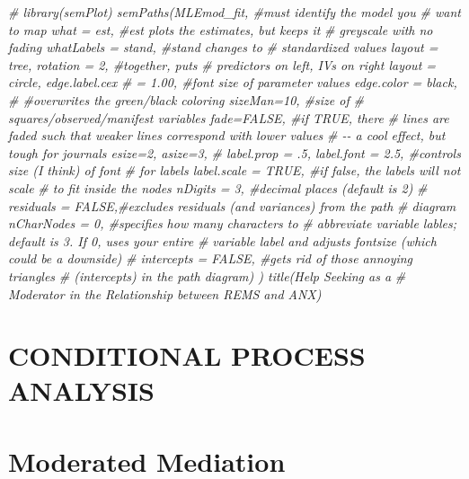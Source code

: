 \documentclass[
  11pt,
]{book}
\newenvironment{Shaded}{\begin{snugshade}}{\end{snugshade}}
\newcommand{\CommentTok}[1]{\textcolor[rgb]{0.37,0.37,0.37}{\textit{#1}}}
\begin{document}
\begin{Shaded}
\begin{Highlighting}[]
\CommentTok{\# library(semPlot) semPaths(MLEmod\_fit, \#must identify the model you}
\CommentTok{\# want to map what = \textquotesingle{}est\textquotesingle{}, \#\textquotesingle{}est\textquotesingle{} plots the estimates, but keeps it}
\CommentTok{\# greyscale with no fading whatLabels = \textquotesingle{}stand\textquotesingle{}, \#\textquotesingle{}stand\textquotesingle{} changes to}
\CommentTok{\# standardized values layout = \textquotesingle{}tree\textquotesingle{}, rotation = 2, \#together, puts}
\CommentTok{\# predictors on left, IVs on right layout = \textquotesingle{}circle\textquotesingle{}, edge.label.cex}
\CommentTok{\# = 1.00, \#font size of parameter values edge.color = \textquotesingle{}black\textquotesingle{},}
\CommentTok{\# \#overwrites the green/black coloring sizeMan=10, \#size of}
\CommentTok{\# squares/observed/\textquotesingle{}manifest\textquotesingle{} variables fade=FALSE, \#if TRUE, there}
\CommentTok{\# lines are faded such that weaker lines correspond with lower values}
\CommentTok{\# {-}{-} a cool effect, but tough for journals esize=2, asize=3,}
\CommentTok{\# label.prop = .5, label.font = 2.5, \#controls size (I think) of font}
\CommentTok{\# for labels label.scale = TRUE, \#if false, the labels will not scale}
\CommentTok{\# to fit inside the nodes nDigits = 3, \#decimal places (default is 2)}
\CommentTok{\# residuals = FALSE,\#excludes residuals (and variances) from the path}
\CommentTok{\# diagram nCharNodes = 0, \#specifies how many characters to}
\CommentTok{\# abbreviate variable lables; default is 3.  If 0, uses your entire}
\CommentTok{\# variable label and adjusts fontsize (which could be a downside)}
\CommentTok{\# intercepts = FALSE, \#gets rid of those annoying triangles}
\CommentTok{\# (intercepts) in the path diagram) ) title(\textquotesingle{}Help Seeking as a}
\CommentTok{\# Moderator in the Relationship between REMS and ANX\textquotesingle{})}
\end{Highlighting}
\end{Shaded}

\hypertarget{CPAnal}{%
\chapter*{CONDITIONAL PROCESS ANALYSIS}\label{CPAnal}}


\hypertarget{ModMed}{%
\chapter{Moderated Mediation}\label{ModMed}}
\end{document}

